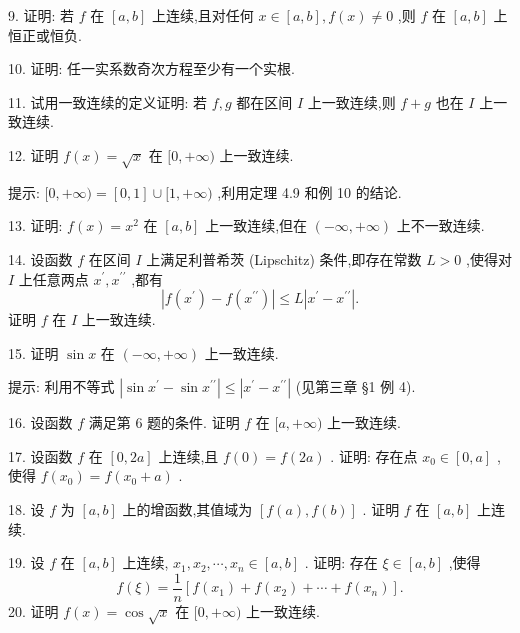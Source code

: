 9. 证明: 若 \(f\) 在 \(\left\lbrack  {a,b}\right\rbrack\) 上连续,且对任何 \(x \in  \left\lbrack  {a,b}\right\rbrack  ,f\left( x\right)  \neq  0\) ,则 \(f\) 在 \(\left\lbrack  {a,b}\right\rbrack\) 上恒正或恒负.

10. 证明: 任一实系数奇次方程至少有一个实根.

11. 试用一致连续的定义证明: 若 \(f,g\) 都在区间 \(I\) 上一致连续,则 \(f + g\) 也在 \(I\) 上一致连续.

12. 证明 \(f\left( x\right)  = \sqrt{x}\) 在 \(\lbrack 0, + \infty )\) 上一致连续.

提示: \(\lbrack 0, + \infty ) = \left\lbrack  {0,1}\right\rbrack   \cup  \lbrack 1, + \infty )\) ,利用定理 4.9 和例 10 的结论.

13. 证明: \(f\left( x\right)  = {x}^{2}\) 在 \(\left\lbrack  {a,b}\right\rbrack\) 上一致连续,但在 \(\left( {-\infty , + \infty }\right)\) 上不一致连续.

14. 设函数 \(f\) 在区间 \(I\) 上满足利普希茨 (Lipschitz) 条件,即存在常数 \(L > 0\) ,使得对 \(I\) 上任意两点 \({x}^{\prime },{x}^{\prime \prime }\) ,都有
\[
\left| {f\left( {x}^{\prime }\right)  - f\left( {x}^{\prime \prime }\right) }\right|  \leq  L\left| {{x}^{\prime } - {x}^{\prime \prime }}\right| .
\]
证明 \(f\) 在 \(I\) 上一致连续.

15. 证明 \(\sin x\) 在 \(\left( {-\infty , + \infty }\right)\) 上一致连续.

提示: 利用不等式 \(\left| {\sin {x}^{\prime } - \sin {x}^{\prime \prime }}\right|  \leq  \left| {{x}^{\prime } - {x}^{\prime \prime }}\right|\) (见第三章 §1 例 4).

16. 设函数 \(f\) 满足第 6 题的条件. 证明 \(f\) 在 \(\lbrack a, + \infty )\) 上一致连续.

17. 设函数 \(f\) 在 \(\left\lbrack  {0,{2a}}\right\rbrack\) 上连续,且 \(f\left( 0\right)  = f\left( {2a}\right)\) . 证明: 存在点 \({x}_{0} \in  \left\lbrack  {0,a}\right\rbrack\) ,使得 \(f\left( {x}_{0}\right)  = f\left( {{x}_{0} + a}\right)\) .

18. 设 \(f\) 为 \(\left\lbrack  {a,b}\right\rbrack\) 上的增函数,其值域为 \(\left\lbrack  {f\left( a\right) ,f\left( b\right) }\right\rbrack\) . 证明 \(f\) 在 \(\left\lbrack  {a,b}\right\rbrack\) 上连续.

19. 设 \(f\) 在 \(\left\lbrack  {a,b}\right\rbrack\) 上连续, \({x}_{1},{x}_{2},\cdots ,{x}_{n} \in  \left\lbrack  {a,b}\right\rbrack\) . 证明: 存在 \(\xi  \in  \left\lbrack  {a,b}\right\rbrack\) ,使得
\[
f\left( \xi \right)  = \frac{1}{n}\left\lbrack  {f\left( {x}_{1}\right)  + f\left( {x}_{2}\right)  + \cdots  + f\left( {x}_{n}\right) }\right\rbrack  .
\]
20. 证明 \(f\left( x\right)  = \cos \sqrt{x}\) 在 \(\lbrack 0, + \infty )\) 上一致连续.

